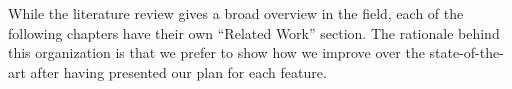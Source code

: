 While the literature review gives a broad overview in the field,
each of the following chapters have their own ``Related Work'' section.
The rationale behind this organization is that we prefer to show how we improve over the state-of-the-art after having presented our plan for each feature.

